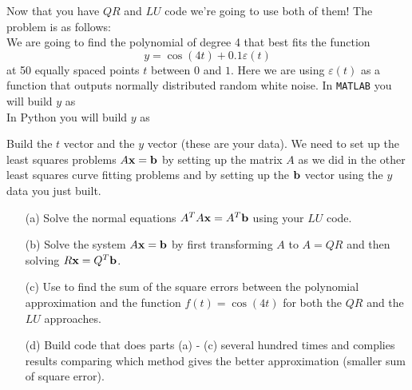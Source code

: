 \begin{problem}
    Now that you have $QR$ and $LU$ code we're going to use both of them!  The problem is
    as follows: \\
    We are going to find the polynomial of degree 4 that best fits the function 
    \[ y =
    \cos(4t) + 0.1 \varepsilon(t) \]
    at 50 equally spaced points $t$ between $0$ and $1$.  Here
    we are using $\varepsilon(t)$ as a function that outputs normally distributed random
    white noise.  
    \ifnum{}
    In \texttt{MATLAB} you will build $y$ as \\
    \else
    In Python you will build $y$ as \\
    \fi
    
    Build the $t$ vector
    and the $y$ vector (these are your data).  We need to set up the least squares
    problems $A {\bf x} = {\bf b}$ by setting up the matrix $A$
    as we did in the other least squares curve fitting problems and by setting up the
    ${\bf b}$ vector using the $y$ data you just built.  
    \begin{enumerate}
        \item[(a)] Solve the normal equations $A^T A {\bf x} = A^T {\bf b}$ using your $LU$ code.
        \item[(b)] Solve the system $A {\bf x} = {\bf b}$ by first transforming $A$ to $A = QR$
            and then solving $R{\bf x} = Q^T {\bf b}$.
        \item[(c)] Use \ProgLang to find the sum of the square errors between the
            polynomial approximation and the function $f(t) = \cos(4t)$ for both the $QR$
            and the $LU$ approaches.  
        \item[(d)] Build \ProgLang code that does parts (a) - (c) several hundred
            times and complies results comparing which method gives the better
            approximation (smaller sum of square error).
    \end{enumerate}
\end{problem}


